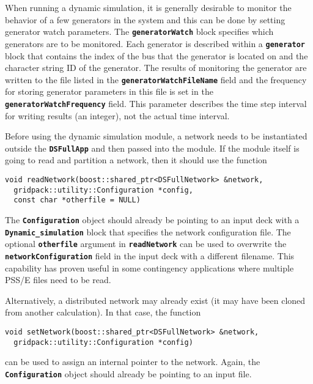 When running a dynamic simulation, it is generally desirable to monitor the behavior of a few generators in the system and this can be done by setting generator watch parameters. The \texttt{\textbf{generatorWatch}} block specifies which generators are to be monitored. Each generator is described within a \texttt{\textbf{generator}} block that contains the index of the bus that the generator is located on and the character string ID of the generator. The results of monitoring the generator are written to the file listed in the \texttt{\textbf{generatorWatchFileName}} field and the frequency for storing generator parameters in this file is set in the \texttt{\textbf{generatorWatchFrequency}} field. This parameter describes the time step interval for writing results (an integer), not the actual time interval.

Before using the dynamic simulation module, a network needs to be instantiated outside the \texttt{\textbf{DSFullApp}} and then passed into the module. If the module itself is going to read and partition a network, then it should use the function

{
\color{red}
\begin{Verbatim}[fontseries=b]
void readNetwork(boost::shared_ptr<DSFullNetwork> &network,
  gridpack::utility::Configuration *config,
  const char *otherfile = NULL)
\end{Verbatim}
}

The \texttt{\textbf{Configuration}} object should already be pointing to an input deck with a \texttt{\textbf{Dynamic\_simulation}} block that specifies the network configuration file. The optional \texttt{\textbf{otherfile}} argument in \texttt{\textbf{readNetwork}} can be used to overwrite the \texttt{\textbf{networkConfiguration}} field in the input deck with a different filename. This capability has proven useful in some contingency applications where multiple PSS/E files need to be read.

Alternatively, a distributed network may already exist (it may have been cloned from another calculation). In that case, the function

{
\color{red}
\begin{Verbatim}[fontseries=b]
void setNetwork(boost::shared_ptr<DSFullNetwork> &network,
  gridpack::utility::Configuration *config)
\end{Verbatim}
}

can be used to assign an internal pointer to the network. Again, the \texttt{\textbf{Configuration}} object should already be pointing to an input file.

